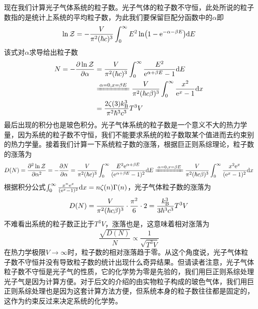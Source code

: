 \documentclass[../../main.tex]{subfiles}
\begin{document}
现在我们计算光子气体系统的粒子数。光子气体的粒子数不守恒，此处所说的粒子数指的是统计上系统的平均粒子数，为此我们要保留巨配分函数中的\(\alpha\)即
\begin{equation}
    \ln\mathcal{Z}=-\frac{V}{\pi^2(\hbar c)^3}\int_0^{\infty}E^2\ln(1-\mathrm{e}^{-\alpha-\beta E})\dd E
\end{equation}
该式对\(\alpha\)求导给出粒子数
\begin{equation}
    \begin{split}
        N=-\pdv{\ln\mathcal{Z}}{\alpha}&=\frac{V}{\pi^2(\hbar c)^3}\int_0^{\infty}\frac{E^2}{\e^{\alpha+\beta E}-1}\dd E \\
        & \xlongequal{\alpha=0,x=\beta E}\frac{V}{\pi^2(\hbar c\beta)^3}\int_0^{\infty}\frac{x^2}{\e^{x}-1}\dd x \\
        &=\frac{2\zeta(3)\k^3}{\pi^2\hbar^3 c^3}T^3V
    \end{split}
\end{equation}
最后出现的积分也是玻色积分。光子气体系统的粒子数是一个意义不大的热力学量，因为系统的粒子数不守恒，我们不能要求系统的粒子数取某个值进而去约束别的热力学量。接着我们计算一下系统粒子数的涨落，根据巨正则系综理论，粒子数的涨落为
\begin{equation}
    D(N)=\pdv[2]{\ln\mathcal{Z}}{\alpha}=-\pdv{N}{\alpha}=\frac{V}{\pi^2(\hbar c)^3}\int_0^{\infty}\frac{E^2\e^{\alpha+\beta E}}{(\e^{\alpha+\beta E}-1)^2}\dd E\xlongequal{\alpha=0,x=\beta E}\frac{V}{\pi^2(\hbar c\beta)^3}\int_0^{\infty}\frac{x^2\e^{x}}{(\e^{x}-1)^2}\dd x
\end{equation}
根据积分公式\(\int_0^{\infty}\frac{x^n\mathrm{e}^{x}}{(\mathrm{e}^{x}-1)^2}\dd x=n\zeta(n)\Gamma(n)\)，光子气体粒子数的涨落为
\begin{equation}
    D(N)=\frac{V}{\pi^2(\hbar c\beta)^3}\cdot \frac{\pi^2}{6}\cdot 2=\frac{k_{\mathrm{B}}^3}{3\hbar^3c^3}T^3V
\end{equation}
不难看出系统的粒子数正比于\(T^3V\)，涨落也是，这意味着相对涨落为
\begin{equation}
    \frac{\sqrt{D(N)}}{N}\propto\frac{1}{\sqrt{T^3V}}
\end{equation}
在热力学极限\(V\to\infty\)时，粒子数的相对涨落趋于零。从这个角度说，光子气体粒子数不守恒并没有导致粒子数的统计出现什么奇异结果。但请读者注意，光子气体粒子数不守恒是光子气的性质，它的化学势为零是先验的，我们用巨正则系综处理光子气是因为计算方便。对于后文的介绍的由实物粒子构成的玻色气体，我们用巨正则系综处理也是因为这套计算方法方便，但系统本身的粒子数往往都是固定的，这作为约束反过来决定系统的化学势。
\end{document}

